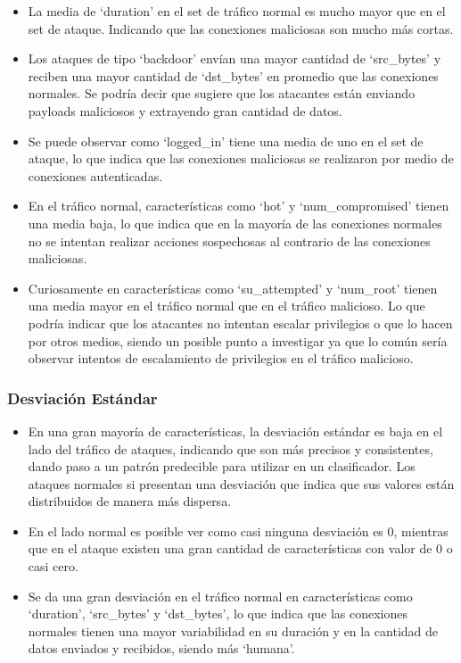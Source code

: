 \documentclass[12pt,a4paper]{article}
\begin{document}
\begin{itemize}
  \item La media de `duration' en el set de tráfico normal es mucho mayor que en el set de ataque.
    Indicando que las conexiones maliciosas son mucho más cortas.
  \item Los ataques de tipo `backdoor' envían una mayor cantidad de `src_bytes' y reciben una mayor cantidad de `dst_bytes' en promedio que las conexiones normales.
    Se podría decir que sugiere que los atacantes están enviando payloads maliciosos y extrayendo gran cantidad de datos.
  \item Se puede observar como `logged_in' tiene una media de uno en el set de ataque, lo que indica que las conexiones maliciosas se realizaron por medio de conexiones autenticadas.
  \item En el tráfico normal, características como `hot' y `num_compromised' tienen una media baja, lo que indica que en la mayoría de las conexiones normales no se intentan realizar acciones sospechosas al contrario de las conexiones maliciosas.
  \item Curiosamente en características como `su_attempted' y `num_root' tienen una media mayor en el tráfico normal que en el tráfico malicioso.
    Lo que podría indicar que los atacantes no intentan escalar privilegios o que lo hacen por otros medios, siendo un posible punto a investigar ya que lo común sería observar intentos de escalamiento de privilegios en el tráfico malicioso.
\end{itemize}

\subsubsection{Desviación Estándar}

\begin{itemize}
  \item En una gran mayoría de características, la desviación estándar es baja en el lado del tráfico de ataques, indicando que son más precisos y consistentes, dando paso a un patrón predecible para utilizar en un clasificador.
    Los ataques normales si presentan una desviación que indica que sus valores están distribuidos de manera más dispersa.
  \item En el lado normal es posible ver como casi ninguna desviación es 0, mientras que en el ataque existen una gran cantidad de características con valor de 0 o casi cero.
  \item Se da una gran desviación en el tráfico normal en características como `duration', `src_bytes' y `dst_bytes', lo que indica que las conexiones normales tienen una mayor variabilidad en su duración y en la cantidad de datos enviados y recibidos, siendo más `humana'.
\end{itemize}
\end{document}
